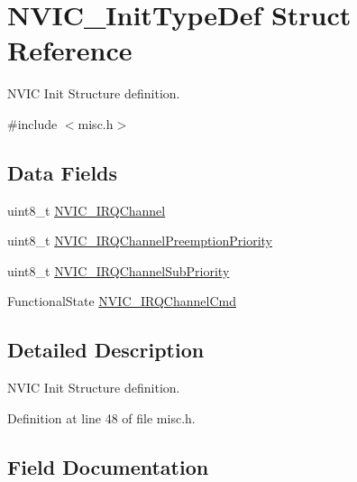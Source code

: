 \hypertarget{struct_n_v_i_c___init_type_def}{}\section{N\+V\+I\+C\+\_\+\+Init\+Type\+Def Struct Reference}
\label{struct_n_v_i_c___init_type_def}


N\+V\+IC Init Structure definition.  




{\ttfamily \#include $<$misc.\+h$>$}

\subsection*{Data Fields}
\begin{DoxyCompactItemize}
\item 
uint8\+\_\+t \hyperlink{struct_n_v_i_c___init_type_def_ae972a759b8b04f3856a614315c03d2d0}{N\+V\+I\+C\+\_\+\+I\+R\+Q\+Channel}
\item 
uint8\+\_\+t \hyperlink{struct_n_v_i_c___init_type_def_aa395d7151e569272cbcf04420a1a4128}{N\+V\+I\+C\+\_\+\+I\+R\+Q\+Channel\+Preemption\+Priority}
\item 
uint8\+\_\+t \hyperlink{struct_n_v_i_c___init_type_def_a91b24559ddbc12752f2414582fb47cb9}{N\+V\+I\+C\+\_\+\+I\+R\+Q\+Channel\+Sub\+Priority}
\item 
Functional\+State \hyperlink{struct_n_v_i_c___init_type_def_a3c5567ef024a0489884083c88f17b4d5}{N\+V\+I\+C\+\_\+\+I\+R\+Q\+Channel\+Cmd}
\end{DoxyCompactItemize}


\subsection{Detailed Description}
N\+V\+IC Init Structure definition. 

Definition at line 48 of file misc.\+h.



\subsection{Field Documentation}
\mbox{\label{struct_n_v_i_c___init_type_def_ae972a759b8b04f3856a614315c03d2d0}} 

